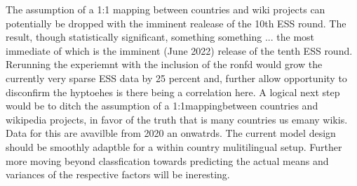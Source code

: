 The assumption of a 1:1 mapping between countries and wiki projects can potentially be dropped with the imminent realease of the 10th ESS round.
The result, though statistically significant, something something ... the most immediate of which is the imminent (June 2022) release of the tenth ESS round. Rerunning the experiemnt with the inclusion of the ronfd would grow the currently very sparse ESS data by 25 percent and, further allow opportunity to disconfirm the hyptoehes is there being a correlation here.
A logical next step would be to ditch the assumption of a 1:1mappingbetween countries and wikipedia projects, in favor of the truth that is many countries us emany wikis. Data for this are avavilble from 2020 an onwatrds.
The current model design should be smoothly adaptble for a within country mulitilingual setup.
Further more moving beyond classfication towards predicting the actual means and variances of the respective factors will be ineresting.


